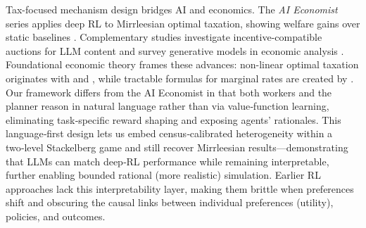 Tax-focused mechanism design bridges AI and economics.  The \textit{AI Economist} series applies deep RL to Mirrleesian optimal taxation, showing welfare gains over static baselines \citep{zheng2020ai,trott2021building,zheng2022ai}.  Complementary studies investigate incentive-compatible auctions for LLM content \citep{duetting2024mechanism} and survey generative models in economic analysis \citep{korinek2024generative}.  Foundational economic theory frames these advances: non-linear optimal taxation originates with \citet{diamond1971optimal} and \citet{mirrlees1976optimal}, while tractable formulas for marginal rates are created by \citet{saez2001using,saez2016generalized}.  
Our framework differs from the AI Economist in that both workers and the planner reason in natural language rather than via value‑function learning, eliminating task‑specific reward shaping and exposing agents’ rationales.
This language‑first design lets us embed census‑calibrated heterogeneity within a two‑level Stackelberg game and still recover Mirrleesian results—demonstrating that LLMs can match deep‑RL performance while remaining interpretable, further enabling bounded rational (more realistic) simulation.
Earlier RL approaches lack this interpretability layer, making them brittle when preferences shift and obscuring the causal links between individual preferences (utility), policies, and outcomes.
